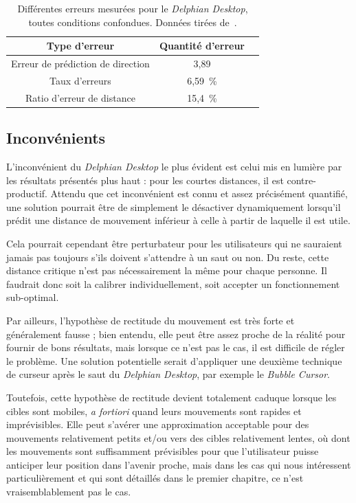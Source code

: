 	\begin{table}
	\centering
	\begin{tabular}{c | c c }
		Type d'erreur						& Quantité d'erreur	\bigstrut[b] \\ \hline
		Erreur de prédiction de direction	& 3,89\textdegree	\bigstrut[t] \\
		Taux d'erreurs						& 6,59~\%{}			\\
		Ratio d'erreur de distance			& 15,4~\%{}			\\
	\end{tabular}
	\caption[\emph{Delphian Desktop} -- erreurs]{Différentes erreurs mesurées pour le \emph{Delphian Desktop}, toutes conditions confondues. Données tirées de~\cite{asano2005predictive}.}
	\label{tab:delphianErrors}
	\end{table}
	
	\subsection{Inconvénients}
	L'inconvénient du \emph{Delphian Desktop} le plus évident est celui mis en lumière par les résultats présentés plus haut : pour les courtes distances, il est contre-productif. Attendu que cet inconvénient est connu et assez précisément quantifié, une solution pourrait être de simplement le désactiver dynamiquement lorsqu'il prédit une distance de mouvement inférieur à celle à partir de laquelle il est utile.
	
	Cela pourrait cependant être perturbateur pour les utilisateurs qui ne sauraient jamais pas toujours s'ils doivent s'attendre à un \og saut \fg{} ou non. Du reste, cette distance critique n'est pas nécessairement la même pour chaque personne. Il faudrait donc soit la calibrer individuellement, soit accepter un fonctionnement sub-optimal.
	
	Par ailleurs, l'hypothèse de rectitude du mouvement est très forte et généralement fausse ; bien entendu, elle peut être assez proche de la réalité pour fournir de bons résultats, mais lorsque ce n'est pas le cas, il est difficile de régler le problème. Une solution potentielle serait d'appliquer une deuxième technique de curseur après le saut du \emph{Delphian Desktop}, par exemple le \emph{Bubble Cursor}.
	
	Toutefois, cette hypothèse de rectitude devient totalement caduque lorsque les cibles sont mobiles, \emph{a fortiori} quand leurs mouvements sont rapides et imprévisibles. Elle peut s'avérer une approximation acceptable pour des mouvements relativement petits et/ou vers des cibles relativement lentes, où dont les mouvements sont suffisamment prévisibles pour que l'utilisateur puisse anticiper leur position dans l'avenir proche, mais dans les cas qui nous intéressent particulièrement et qui sont détaillés dans le premier chapitre, ce n'est vraisemblablement pas le cas.
	
